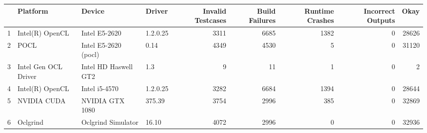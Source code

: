 \begin{tabular}{llllrrrrr}
\toprule
{} &              Platform &                Device &    Driver &  Invalid Testcases &  Build Failures &  Runtime Crashes &  Incorrect Outputs &   Okay \\
\midrule
1 &       Intel(R) OpenCL &         Intel E5-2620 &  1.2.0.25 &               3311 &            6685 &             1382 &                  0 &  28626 \\
2 &                  POCL &  Intel E5-2620 (pocl) &      0.14 &               4349 &            4530 &                5 &                  0 &  31120 \\
3 &  Intel Gen OCL Driver &  Intel HD Haswell GT2 &       1.3 &                  9 &              11 &                1 &                  0 &      2 \\
4 &       Intel(R) OpenCL &         Intel i5-4570 &  1.2.0.25 &               3282 &            6684 &             1394 &                  0 &  28644 \\
5 &           NVIDIA CUDA &       NVIDIA GTX 1080 &    375.39 &               3754 &            2996 &              385 &                  0 &  32869 \\
6 &              Oclgrind &    Oclgrind Simulator &     16.10 &               4072 &            2996 &                0 &                  0 &  32936 \\
\bottomrule
\end{tabular}

